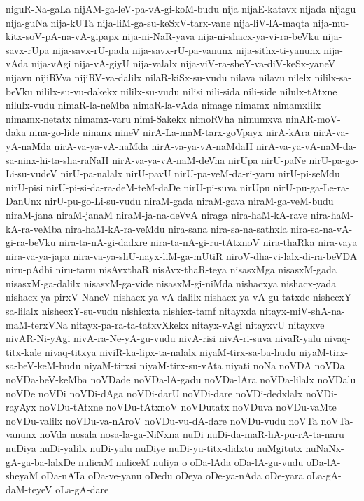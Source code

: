 {niguR-Na-gaLa
nijAM-ga-leV-pa-vA-gi-koM-budu
nija
nijaE-katavx
nijada
nijagu
nija-guNa
nija-kUTa
nija-liM-ga-su-keSxV-tarx-vane
nija-liV-lA-maqta
nija-mu-kitx-soV-pA-na-vA-gipapx
nija-ni-NaR-yava
nija-ni-shacx-ya-vi-ra-beVku
nija-savx-rUpa
nija-savx-rU-pada
nija-savx-rU-pa-vanunx
nija-sithx-ti-yanunx
nija-vAda
nija-vAgi
nija-vA-giyU
nija-valalx
nija-viV-ra-sheY-va-diV-keSx-yaneV
nijavu
nijiRVva
nijiRV-va-dalilx
nilaR-kiSx-su-vudu
nilava
nilavu
nilelx
nililx-sa-beVku
nililx-su-vu-dakekx
nililx-su-vudu
nilisi
nili-sida
nili-side
nilulx-tAtxne
nilulx-vudu
nimaR-la-neMba
nimaR-la-vAda
nimage
nimamx
nimamxlilx
nimamx-netatx
nimamx-varu
nimi-Sakekx
nimoRVha
nimumxva
ninAR-moV-daka
nina-go-lide
ninanx
nineV
nirA-La-maM-tarx-goVpayx
nirA-kAra
nirA-va-yA-naMda
nirA-va-ya-vA-naMda
nirA-va-ya-vA-naMdaH
nirA-va-ya-vA-naM-da-sa-ninx-hi-ta-sha-raNaH
nirA-va-ya-vA-naM-deVna
nirUpa
nirU-paNe
nirU-pa-go-Li-su-vudeV
nirU-pa-nalalx
nirU-pavU
nirU-pa-veM-da-ri-yaru
nirU-pi-seMdu
nirU-pisi
nirU-pi-si-da-ra-deM-teM-daDe
nirU-pi-suva
nirUpu
nirU-pu-ga-Le-ra-DanUnx
nirU-pu-go-Li-su-vudu
niraM-gada
niraM-gava
niraM-ga-veM-budu
niraM-jana
niraM-janaM
niraM-ja-na-deVvA
niraga
nira-haM-kA-rave
nira-haM-kA-ra-veMba
nira-haM-kA-ra-veMdu
nira-sana
nira-sa-na-sathxla
nira-sa-na-vA-gi-ra-beVku
nira-ta-nA-gi-dadxre
nira-ta-nA-gi-ru-tAtxnoV
nira-thaRka
nira-vaya
nira-va-ya-japa
nira-va-ya-shU-nayx-liM-ga-mUtiR
niroV-dha-vi-lalx-di-ra-beVDA
niru-pAdhi
niru-tanu
nisAvxthaR
nisAvx-thaR-teya
nisasxMga
nisasxM-gada
nisasxM-ga-dalilx
nisasxM-ga-vide
nisasxM-gi-niMda
nishacxya
nishacx-yada
nishacx-ya-pirxV-NaneV
nishacx-ya-vA-dalilx
nishacx-ya-vA-gu-tatxde
nishecxY-sa-lilalx
nishecxY-su-vudu
nishicxta
nishicx-tamf
nitayxda
nitayx-miV-shA-na-maM-terxVNa
nitayx-pa-ra-ta-tatxvXkekx
nitayx-vAgi
nitayxvU
nitayxve
nivAR-Ni-yAgi
nivA-ra-Ne-yA-gu-vudu
nivA-risi
nivA-ri-suva
nivaR-yalu
nivaq-titx-kale
nivaq-titxya
niviR-ka-lipx-ta-nalalx
niyaM-tirx-sa-ba-hudu
niyaM-tirx-sa-beV-keM-budu
niyaM-tirxsi
niyaM-tirx-su-vAta
niyati
noNa
noVDA
noVDa
noVDa-beV-keMba
noVDade
noVDa-lA-gadu
noVDa-lAra
noVDa-lilalx
noVDalu
noVDe
noVDi
noVDi-dAga
noVDi-darU
noVDi-dare
noVDi-dedxlalx
noVDi-rayAyx
noVDu-tAtxne
noVDu-tAtxnoV
noVDutatx
noVDuva
noVDu-vaMte
noVDu-valilx
noVDu-va-nAroV
noVDu-vu-dA-dare
noVDu-vudu
noVTa
noVTa-vanunx
noVda
nosala
nosa-la-ga-NiNxna
nuDi
nuDi-da-maR-hA-pu-rA-ta-naru
nuDiya
nuDi-yalilx
nuDi-yalu
nuDiye
nuDi-yu-titx-didxtu
nuMgitutx
nuNaNx-gA-ga-ba-lalxDe
nulicaM
nuliceM
nuliya
o
oDa-lAda
oDa-lA-gu-vudu
oDa-lA-sheyaM
oDa-nATa
oDa-ve-yanu
oDedu
oDeya
oDe-ya-nAda
oDe-yara
oLa-gA-daM-teyeV
oLa-gA-dare
}
